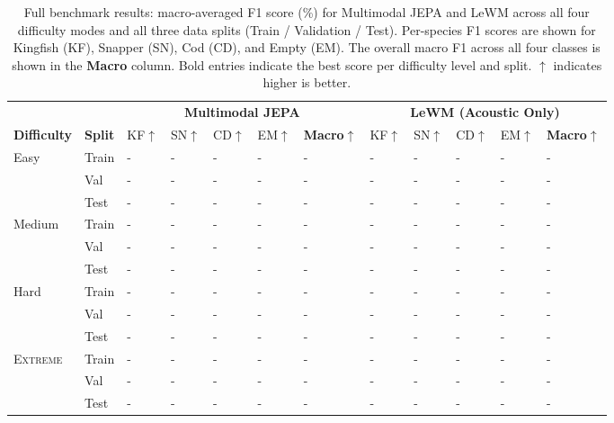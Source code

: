 \begin{table}[t]
\centering
\caption{%
  Full benchmark results: macro-averaged F1 score (\%) for Multimodal JEPA and LeWM across all four
  difficulty modes and all three data splits (Train / Validation / Test).
  Per-species F1 scores are shown for Kingfish (KF), Snapper (SN), Cod (CD), and Empty (EM).
  The overall macro F1 across all four classes is shown in the \textbf{Macro} column.
  Bold entries indicate the best score per difficulty level and split.
  $\uparrow$ indicates higher is better.
}
\label{tab:full_results}
\setlength{\tabcolsep}{4.5pt}
\small
\begin{tabular}{@{}ll lllll lllll@{}}
\toprule
& & \multicolumn{5}{c}{\textbf{Multimodal JEPA} \cite{assran2023self}} 
  & \multicolumn{5}{c}{\textbf{LeWM (Acoustic Only)} \cite{lecun2026le}} \\
\cmidrule(lr){3-7} \cmidrule(lr){8-12}
\textbf{Difficulty} & \textbf{Split} 
  & KF$\uparrow$ & SN$\uparrow$ & CD$\uparrow$ & EM$\uparrow$ & \textbf{Macro}$\uparrow$
  & KF$\uparrow$ & SN$\uparrow$ & CD$\uparrow$ & EM$\uparrow$ & \textbf{Macro}$\uparrow$ \\
\midrule
\multirow{3}{*}{Easy}
  & Train & - & - & - & - & - & - & - & - & - & - \\
  & Val & - & - & - & - & - & - & - & - & - & - \\
  & Test & - & - & - & - & - & - & - & - & - & - \\
\midrule
\multirow{3}{*}{Medium}
  & Train & - & - & - & - & - & - & - & - & - & - \\
  & Val & - & - & - & - & - & - & - & - & - & - \\
  & Test & - & - & - & - & - & - & - & - & - & - \\
\midrule
\multirow{3}{*}{Hard}
  & Train & - & - & - & - & - & - & - & - & - & - \\
  & Val & - & - & - & - & - & - & - & - & - & - \\
  & Test & - & - & - & - & - & - & - & - & - & - \\
\midrule
\multirow{3}{*}{\textsc{Extreme}}
  & Train & - & - & - & - & - & - & - & - & - & - \\
  & Val & - & - & - & - & - & - & - & - & - & - \\
  & Test & - & - & - & - & - & - & - & - & - & - \\


\end{tabular}
\end{table}
